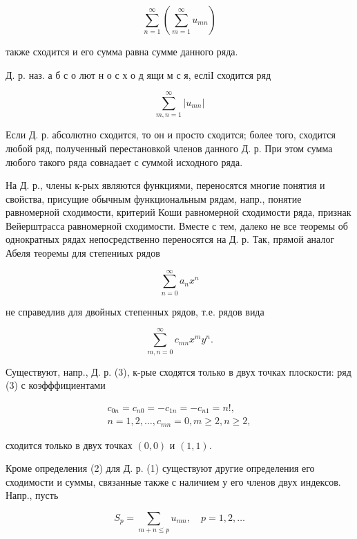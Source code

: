 \documentclass[10pt]{article}
\begin{document}
\[

\sum_{n=1}^{\infty}\left(\sum_{m=1}^{\infty} u_{m n}\right)

\]



также сходится и его сумма равна сумме данного ряда.



Д. р. наз. а б с о лют н о с х о д ящи м с я, есліІ сходится ряд



\[

\sum_{m, n=1}^{\infty}\left|u_{m n}\right|

\]



Если Д. р. абсолютно сходится, то он и просто сходится; более того, сходится любой ряд, полученный перестановкой членов данного Д. р. При этом сумма любого такого ряда совнадает с суммой исходного ряда.



На Д. р., члены к-рых являются функциями, переносятся многие понятия и свойства, присущие обычным функциональным рядам, напр., понятие равномерной сходимости, критерий Коши равномерной сходимости ряда, признак Вейерштрасса равномерной сходимости. Вместе с тем, далеко не все теоремы об однократных рядах непосредственно переносятся на Д. р. Так, прямой аналог Абеля теоремы для степениых рядов



\[

\sum_{n=0}^{\infty} a_{n} x^{n}

\]



не справедлив для двойных степенных рядов, т.е. рядов вида



\[

\sum_{m, n=0}^{\infty} c_{m n} x^{m} y^{n} .

\]



Существуют, напр., Д. р. (3), к-рые сходятся только в двух точках плоскости: ряд (3) с коэфффициентами



\[

\begin{gathered}

c_{0 n}=c_{n 0}=-c_{1 n}=-c_{n 1}=n !, \\

n=1,2, \ldots, c_{m n}=0, m \geqslant 2, n \geqslant 2,

\end{gathered}

\]



сходится только в двух точках $(0,0)$ и $(1,1)$.



Кроме определения (2) для Д. р. (1) существуют другие определения его сходимости и суммы, связанные также с наличием у его членов двух индексов. Напр., пусть



\[

S_{p}=\sum_{m+n \leqslant p} u_{m n}, \quad p=1,2, \ldots

\]
\end{document}
